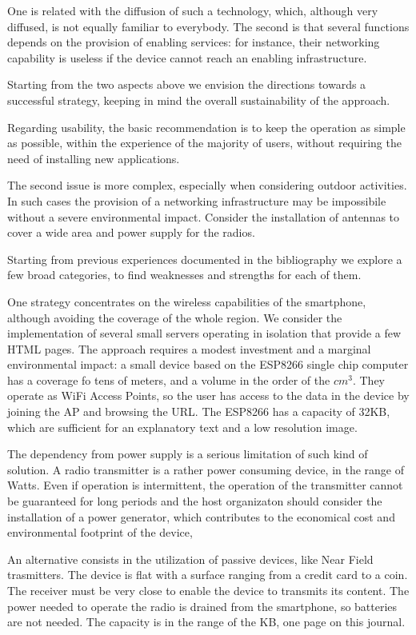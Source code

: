 \documentclass[sustainability,article,submit,pdftex,moreauthors]{Definitions/mdpi}
\begin{document}
One is related with the diffusion of such a technology, which, although very diffused, is not equally familiar to everybody. The second is that several functions depends on the provision of enabling services: for instance, their networking capability is useless if the device cannot reach an enabling infrastructure.

Starting from the two aspects above we envision the directions towards a successful strategy, keeping in mind the overall sustainability of the approach.

Regarding usability, the basic recommendation is to keep the operation as simple as possible, within the experience of the majority of users, without requiring the need of installing new applications.

The second issue is more complex, especially when considering outdoor activities. In such cases the provision of a networking infrastructure may be impossibile without a severe environmental impact. Consider the installation of antennas to cover a wide area and power supply for the radios. 

Starting from previous experiences documented in the bibliography we explore a few broad categories, to find weaknesses and strengths for each of them.

One strategy concentrates on the wireless capabilities of the smartphone, although avoiding the coverage of the whole region. We consider the implementation of several small servers operating in isolation that provide a few HTML pages. The approach requires a modest investment and a marginal environmental impact: a small device based on the ESP8266 single chip computer has a coverage fo tens of meters, and a volume in the order of the $cm^3$. They operate as WiFi Access Points, so the user has access to the data in the device by joining the AP and browsing the URL. The ESP8266 has a capacity of 32KB, which are sufficient for an explanatory text and a low resolution image.

The dependency from power supply is a serious limitation of such kind of solution. A radio transmitter is a rather power consuming device, in the range of Watts. Even if operation is intermittent, the operation of the transmitter cannot be guaranteed for long periods and the host organizaton should consider the installation of a power generator, which contributes to the economical cost and environmental footprint of the device,

An alternative consists in the utilization of passive devices, like Near Field trasmitters. The device is flat with a surface ranging from a credit card to a coin. The receiver must be very close to enable the device to transmits its content. The power needed to operate the radio is drained from the smartphone, so batteries are not needed. The capacity is in the range of the KB, one page on this journal.
\end{document}

